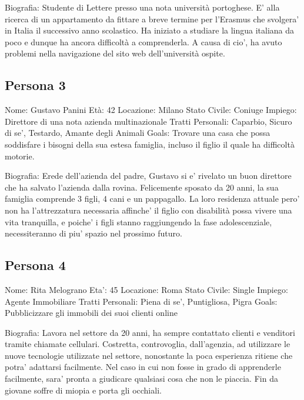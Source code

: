     Biografia: Studente di Lettere presso una nota università portoghese. E' alla ricerca di un appartamento da fittare a breve termine per l'Erasmus che svolgera' in Italia il successivo anno scolastico. Ha iniziato a studiare la lingua italiana da poco e dunque ha ancora difficoltà a comprenderla. A causa di cio', ha avuto problemi nella navigazione del sito web dell'università ospite.

    \subsection{Persona 3}

    Nome: Gustavo Panini
    Età: 42
    Locazione: Milano
    Stato Civile: Coniuge
    Impiego: Direttore di una nota azienda multinazionale
    Tratti Personali: Caparbio, Sicuro di se', Testardo, Amante degli Animali
    Goals: Trovare una casa che possa soddisfare i bisogni della sua estesa famiglia, incluso il figlio il quale ha difficoltà motorie.

    Biografia: Erede dell'azienda del padre, Gustavo si e' rivelato un buon direttore che ha salvato l'azienda dalla rovina. Felicemente sposato da 20 anni, la sua famiglia comprende 3 figli, 4 cani e un pappagallo. La loro residenza attuale pero' non ha l'attrezzatura necessaria affinche' il figlio con disabilità possa vivere una vita tranquilla, e poiche' i figli stanno raggiungendo la fase adolescenziale, necessiteranno di piu' spazio nel prossimo futuro.

    \subsection{Persona 4}

    Nome: Rita Melograno
    Eta': 45
    Locazione: Roma
    Stato Civile: Single
    Impiego: Agente Immobiliare
    Tratti Personali: Piena di se', Puntigliosa, Pigra
    Goals: Pubblicizzare gli immobili dei suoi clienti online

    Biografia: Lavora nel settore da 20 anni, ha sempre contattato clienti e venditori tramite chiamate cellulari. Costretta, controvoglia, dall'agenzia, ad utilizzare le nuove tecnologie utilizzate nel settore, nonostante la poca esperienza ritiene che potra' adattarsi facilmente. Nel caso in cui non fosse in grado di apprenderle facilmente, sara' pronta a giudicare qualsiasi cosa che non le piaccia. Fin da giovane soffre di miopia e porta gli occhiali.